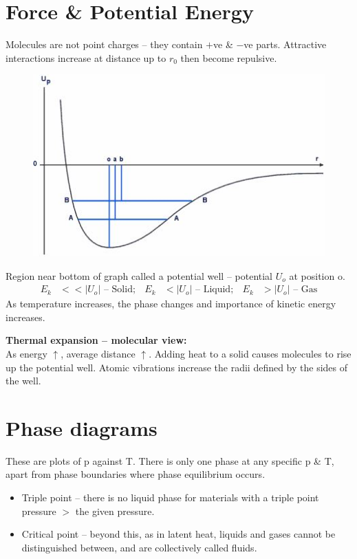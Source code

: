 \documentclass[a4paper, 11pt, normalem]{report}
\begin{document}
\section{Force \& Potential Energy}
Molecules are not point charges -- they contain $+$ve \& $-$ve parts.
Attractive interactions increase at distance up to $r_{0}$ then become repulsive. 
\begin{figure}[H]
    \centering
    \includegraphics[scale=0.9]{PotWell.jpg}
\end{figure}
Region near bottom of graph called a potential well -- potential $U_{o}$ at position o.
\begin{align}
    E_{k} &<< |U_{o}| \text{ -- Solid}; &
    E_{k} &< |U_{o}| \text{ -- Liquid}; &
    E_{k} &> |U_{o}| \text{ -- Gas}
\end{align}
As temperature increases, the phase changes and importance of kinetic energy increases.

\textbf{Thermal expansion -- molecular view:}\\
As energy $\uparrow$, average distance $\uparrow$.
Adding heat to a solid causes molecules to rise up the potential well.
Atomic vibrations increase the radii defined by the sides of the well.

\section{Phase diagrams}
These are plots of p against T.
There is only one phase at any specific p \& T, apart from phase boundaries where phase equilibrium occurs.
\begin{itemize}
    \item Triple point -- there is no liquid phase for materials with a triple point pressure $>$ the given pressure.
    \item Critical point -- beyond this, as in latent heat, liquids and gases cannot be distinguished between, and are collectively called fluids.
\end{itemize}
\end{document}
